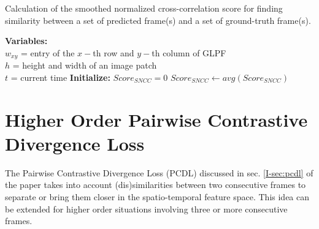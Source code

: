 \documentclass{article}
\begin{document}
  \begin{algorithm}[t]
  	\caption{Calculation of the smoothed normalized cross-correlation score for finding similarity between a set of predicted frame(s) and a set of ground-truth frame(s).}
  	\SetAlgoLined
  	\textbf{Variables:}\\
  	$ w_{xy} $ = entry of the $ x- $th row and $ y- $th column of GLPF\\
  	$ h $ = height and width of an image patch\\
  	$ t $ = current time\;
  	\textbf{Initialize:} $ Score_{SNCC} = 0 $\;
  	$ Score_{SNCC} \leftarrow avg(Score_{SNCC}) $\;
  	\label{algo:sncc}
  \end{algorithm} 
  
\section{Higher Order Pairwise Contrastive Divergence Loss}
  \label{sec:hopcdl}  
  The Pairwise Contrastive Divergence Loss (PCDL) discussed in sec. \ref{I-sec:pcdl} of the paper takes into account (dis)similarities between two consecutive frames to separate or bring them closer in the spatio-temporal feature space. This idea can be extended for higher order situations involving three or more consecutive frames.
  
\end{document}
